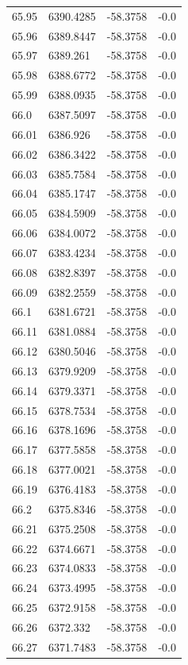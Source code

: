 \begin{table}[H]
\begin{tabular}{llll}
65.95 & 6390.4285 & -58.3758 & -0.0 \\
65.96 & 6389.8447 & -58.3758 & -0.0 \\
65.97 & 6389.261 & -58.3758 & -0.0 \\
65.98 & 6388.6772 & -58.3758 & -0.0 \\
65.99 & 6388.0935 & -58.3758 & -0.0 \\
66.0 & 6387.5097 & -58.3758 & -0.0 \\
66.01 & 6386.926 & -58.3758 & -0.0 \\
66.02 & 6386.3422 & -58.3758 & -0.0 \\
66.03 & 6385.7584 & -58.3758 & -0.0 \\
66.04 & 6385.1747 & -58.3758 & -0.0 \\
66.05 & 6384.5909 & -58.3758 & -0.0 \\
66.06 & 6384.0072 & -58.3758 & -0.0 \\
66.07 & 6383.4234 & -58.3758 & -0.0 \\
66.08 & 6382.8397 & -58.3758 & -0.0 \\
66.09 & 6382.2559 & -58.3758 & -0.0 \\
66.1 & 6381.6721 & -58.3758 & -0.0 \\
66.11 & 6381.0884 & -58.3758 & -0.0 \\
66.12 & 6380.5046 & -58.3758 & -0.0 \\
66.13 & 6379.9209 & -58.3758 & -0.0 \\
66.14 & 6379.3371 & -58.3758 & -0.0 \\
66.15 & 6378.7534 & -58.3758 & -0.0 \\
66.16 & 6378.1696 & -58.3758 & -0.0 \\
66.17 & 6377.5858 & -58.3758 & -0.0 \\
66.18 & 6377.0021 & -58.3758 & -0.0 \\
66.19 & 6376.4183 & -58.3758 & -0.0 \\
66.2 & 6375.8346 & -58.3758 & -0.0 \\
66.21 & 6375.2508 & -58.3758 & -0.0 \\
66.22 & 6374.6671 & -58.3758 & -0.0 \\
66.23 & 6374.0833 & -58.3758 & -0.0 \\
66.24 & 6373.4995 & -58.3758 & -0.0 \\
66.25 & 6372.9158 & -58.3758 & -0.0 \\
66.26 & 6372.332 & -58.3758 & -0.0 \\
66.27 & 6371.7483 & -58.3758 & -0.0 \\

\end{tabular}
\end{table}
